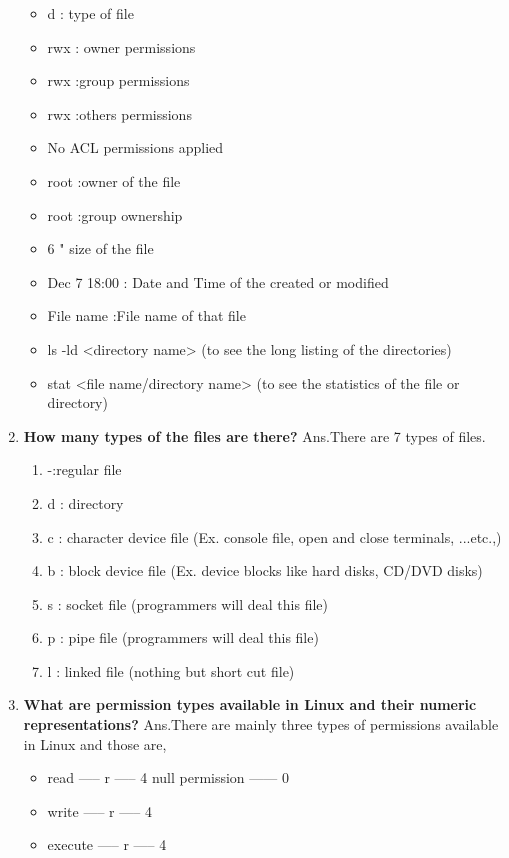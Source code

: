 \begin{enumerate}
\begin{itemize}
        \item d : type of file
        \item rwx : owner permissions
        \item rwx :group permissions
        \item rwx :others permissions
        \item No ACL permissions applied
        \item root :owner of the file
        \item root :group ownership
        \item 6    " size of the file
        \item Dec 7  18:00 : Date and Time of the created or modified
        \item File name :File name of that file
        \item ls    -ld    <directory name>	(to see the long listing of the directories)
        \item stat    <file name/directory name>	(to see the statistics of the file or directory)
    \end{itemize}  
    
    \bigskip
    \bigskip

    \item \textbf{How many types of the files are there?}
    \newline
    Ans.There are 7 types of files.
    \begin{enumerate}
        \item  -:regular file
        \item d :  directory
        \item c : character device file  (Ex.  console file,  open and close terminals, ...etc.,)
        \item b : block device file  (Ex.  device blocks like hard disks, CD/DVD disks)
        \item s :   socket file  (programmers will deal this file)
        \item p :   pipe file      (programmers will deal this file)
        \item l :   linked  file  (nothing but short cut file)
    \end{enumerate}

    \bigskip
    \bigskip

    \item \textbf{What are permission types available in Linux and their numeric representations?}
    \newline
    Ans.There are mainly three types of permissions available in Linux and those are,
    \begin{itemize}
        \item read         -----     r     -----     4	null permission    ------   0
        \item write        -----     r     -----     4
        \item execute   -----     r     -----     4
    \end{itemize}


\end{enumerate}
